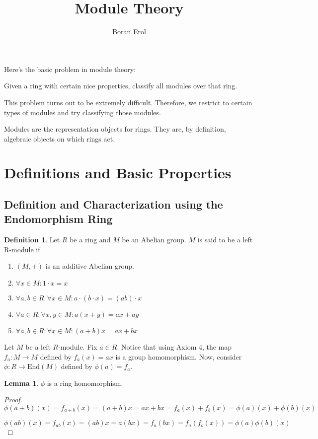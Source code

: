 \documentclass{article}
\title{Module Theory}
\author{Boran Erol}
\theoremstyle{definition}
\newtheorem{definition}{Definition}
\newtheorem{lemma}[theorem]{Lemma}
\begin{document}
\maketitle

Here's the basic problem in module theory:

Given a ring with certain nice properties, classify all modules over that ring.

This problem turns out to be extremely difficult. Therefore, we restrict to certain types of modules and try classifying those modules.

Modules are the representation objects for rings. They are, by definition, algebraic objects on which rings act.

\section{Definitions and Basic Properties}

\subsection{Definition and Characterization using the Endomorphism Ring}

\begin{definition}
    Let $R$ be a ring and $M$ be an Abelian group. $M$ is said to be a left R-module if
    \begin{enumerate}
        \item $(M,+)$ is an additive Abelian group.
        \item $\forall x \in M: 1 \cdot x = x$
        \item $\forall a,b \in R: \forall x \in M: a \cdot (b \cdot x) = (ab) \cdot x$
        \item $\forall a \in R: \forall x,y \in M: a(x + y) = ax + ay$
        \item $\forall a,b \in R: \forall x \in M: (a + b)x = ax + bx$
    \end{enumerate}
\end{definition}

Let $M$ be a left $R$-module. Fix $a \in R$. Notice that using Axiom 4, the map $f_{a}: M \xrightarrow{} M$ defined by $f_{a}(x) = ax$ is a group homomorphism. Now, consider $\phi: R \xrightarrow{} \text{End}(M)$ defined by $\phi(a) = f_{a}$. 

\begin{lemma}
    $\phi$ is a ring homomorphism.
\end{lemma}
\begin{proof}
    \[ \phi(a + b)(x) = f_{a+b}(x) = (a+b)x = ax + bx = f_{a}(x) + f_{b}(x) = \phi(a)(x) + \phi(b)(x)\]

    \[ \phi(ab)(x) = f_{ab}(x) = (ab)x = a(bx) = f_{a}(bx) = f_{a}(f_{b}(x)) = \phi(a)\phi(b)(x)\]    
\end{proof}
\end{document}
